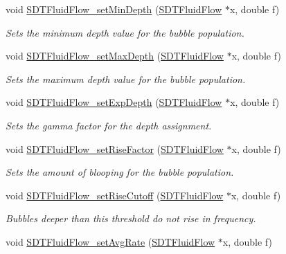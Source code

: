 \begin{DoxyCompactItemize}
void \hyperlink{group__fluidflow_gafcb871876cb30f6a1057926a577a5bd6}{S\+D\+T\+Fluid\+Flow\+\_\+set\+Min\+Depth} (\hyperlink{group__fluidflow_ga2df6b1f85ce5d2b1dfb5943ef84cd132}{S\+D\+T\+Fluid\+Flow} $\ast$x, double f)
\begin{DoxyCompactList}\small\item\em Sets the minimum depth value for the bubble population. \end{DoxyCompactList}\item 
void \hyperlink{group__fluidflow_gafceba9a9992d28b9b8fb31931d90c550}{S\+D\+T\+Fluid\+Flow\+\_\+set\+Max\+Depth} (\hyperlink{group__fluidflow_ga2df6b1f85ce5d2b1dfb5943ef84cd132}{S\+D\+T\+Fluid\+Flow} $\ast$x, double f)
\begin{DoxyCompactList}\small\item\em Sets the maximum depth value for the bubble population. \end{DoxyCompactList}\item 
void \hyperlink{group__fluidflow_ga3eda104aac66882a84162c197922af26}{S\+D\+T\+Fluid\+Flow\+\_\+set\+Exp\+Depth} (\hyperlink{group__fluidflow_ga2df6b1f85ce5d2b1dfb5943ef84cd132}{S\+D\+T\+Fluid\+Flow} $\ast$x, double f)
\begin{DoxyCompactList}\small\item\em Sets the gamma factor for the depth assignment. \end{DoxyCompactList}\item 
void \hyperlink{group__fluidflow_ga7f24b38de9b85ad2d06d25b6d807b2c7}{S\+D\+T\+Fluid\+Flow\+\_\+set\+Rise\+Factor} (\hyperlink{group__fluidflow_ga2df6b1f85ce5d2b1dfb5943ef84cd132}{S\+D\+T\+Fluid\+Flow} $\ast$x, double f)
\begin{DoxyCompactList}\small\item\em Sets the amount of blooping for the bubble population. \end{DoxyCompactList}\item 
void \hyperlink{group__fluidflow_ga165e0cedcfba37141d0250db467d9e4a}{S\+D\+T\+Fluid\+Flow\+\_\+set\+Rise\+Cutoff} (\hyperlink{group__fluidflow_ga2df6b1f85ce5d2b1dfb5943ef84cd132}{S\+D\+T\+Fluid\+Flow} $\ast$x, double f)
\begin{DoxyCompactList}\small\item\em Bubbles deeper than this threshold do not rise in frequency. \end{DoxyCompactList}\item 
void \hyperlink{group__fluidflow_gab315da9a42eb440b577e4f546eff86f2}{S\+D\+T\+Fluid\+Flow\+\_\+set\+Avg\+Rate} (\hyperlink{group__fluidflow_ga2df6b1f85ce5d2b1dfb5943ef84cd132}{S\+D\+T\+Fluid\+Flow} $\ast$x, double f)

\end{DoxyCompactItemize}
